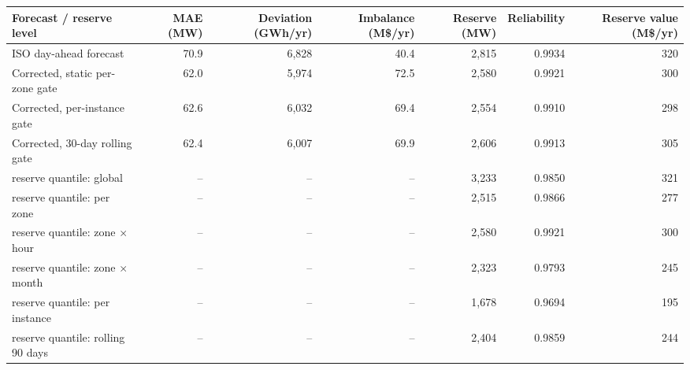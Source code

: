 \begin{tabular}{@{}l r r r r r r@{}}\toprule
Forecast / reserve level & MAE (MW) & Deviation (GWh/yr) & Imbalance (M\$/yr) & Reserve (MW) & Reliability & Reserve value (M\$/yr) \\\midrule
ISO day-ahead forecast & 70.9 & 6,828 & 40.4 & 2,815 & 0.9934 & 320 \\
Corrected, static per-zone gate & 62.0 & 5,974 & 72.5 & 2,580 & 0.9921 & 300 \\
Corrected, per-instance gate & 62.6 & 6,032 & 69.4 & 2,554 & 0.9910 & 298 \\
Corrected, 30-day rolling gate & 62.4 & 6,007 & 69.9 & 2,606 & 0.9913 & 305 \\
\midrule
\quad reserve quantile: global & -- & -- & -- & 3,233 & 0.9850 & 321 \\
\quad reserve quantile: per zone & -- & -- & -- & 2,515 & 0.9866 & 277 \\
\quad reserve quantile: zone $\times$ hour & -- & -- & -- & 2,580 & 0.9921 & 300 \\
\quad reserve quantile: zone $\times$ month & -- & -- & -- & 2,323 & 0.9793 & 245 \\
\quad reserve quantile: per instance & -- & -- & -- & 1,678 & 0.9694 & 195 \\
\quad reserve quantile: rolling 90 days & -- & -- & -- & 2,404 & 0.9859 & 244 \\
\bottomrule\end{tabular}
